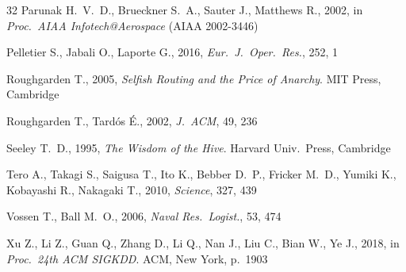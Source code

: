 \documentclass[twoside,twocolumn,usenatbib]{mnras}
\begin{document}
\begin{thebibliography}{32}
 Parunak H.~V.~D.,
Brueckner S.~A., Sauter J., Matthews R., 2002, in \emph{Proc.~AIAA
Infotech@Aerospace} (AIAA 2002-3446)

 Pelletier S., Jabali O.,
Laporte G., 2016, \emph{Eur.~J.~Oper.~Res.}, 252, 1

 Roughgarden T., 2005,
\emph{Selfish Routing and the Price of Anarchy}. MIT Press, Cambridge

 Roughgarden T.,
Tard\'os \'{E}., 2002, \emph{J.~ACM}, 49, 236

 Seeley T.~D., 1995, \emph{The Wisdom
of the Hive}. Harvard Univ.~Press, Cambridge

 Tero A., Takagi S., Saigusa T.,
Ito K., Bebber D.~P., Fricker M.~D., Yumiki K., Kobayashi R.,
Nakagaki T., 2010, \emph{Science}, 327, 439

 Vossen T., Ball M.~O.,
2006, \emph{Naval Res.~Logist.}, 53, 474

 Xu Z., Li Z., Guan Q., Zhang D.,
Li Q., Nan J., Liu C., Bian W., Ye J., 2018, in \emph{Proc.~24th
ACM SIGKDD}. ACM, New York, p.~1903

\end{thebibliography}

\label{lastpage}
\end{document}
